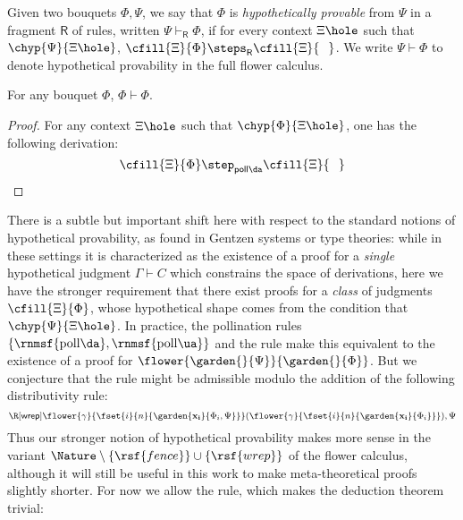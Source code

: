 \begin{definition}
  Given two bouquets $\Phi, \Psi$, we say that $\Phi$ is \emph{hypothetically
  provable} from $\Psi$ in a fragment $\mathsf{R}$ of rules, written $\Psi
  \vdash_{\mathsf{R}} \Phi$, if for every context $\Xi\hole$ such that
  $\chyp{\Psi}{\Xi\hole}$, $\cfill{\Xi}{\Phi} \steps_{\mathsf{R}}
  \cfill{\Xi}{\phantom{\Phi}}$. We write $\Psi \vdash \Phi$ to denote
  hypothetical provability in the full flower calculus.
\end{definition}

\begin{lemma}[Reflexivity]
  For any bouquet $\Phi$, $\Phi \vdash \Phi$.
\end{lemma}
\begin{proof}
  For any context $\Xi\hole$ such that $\chyp{\Phi}{\Xi\hole}$, one has the following
  derivation:
  $$
  \cfill{\Xi}{\Phi} \step_{\mathsf{poll{\da}}}
  \cfill{\Xi}{\phantom{\Phi}}
  $$
\end{proof}

There is a subtle but important shift here with respect to the standard notions
of hypothetical provability, as found in Gentzen systems or type theories: while
in these settings it is characterized as the existence of a proof for a
\emph{single} hypothetical judgment $\Gamma \vdash C$ which constrains the space
of derivations, here we have the stronger requirement that there exist proofs
for a \emph{class} of judgments $\cfill{\Xi}{\Phi}$, whose hypothetical shape
comes from the condition that $\chyp{\Psi}{\Xi\hole}$. In practice, the
pollination rules $\{\text{\rnmsf{poll{\da}}},
\text{\rnmsf{poll{\ua}}}\}$ and the {} rule make this equivalent
to the existence of a proof for $\flower{\garden{{}}{\Psi}}{\garden{{}}{\Phi}}$. But
we conjecture that the {} rule might be admissible modulo the
addition of the following distributivity rule:
$$
\R[\textsf{wrep}]
  {\flower{\gamma}{\fset{i}{n}{\garden{\mathbf{x_i}}{\Phi_i, \Psi}}}}
  {(\flower{\gamma}{\fset{i}{n}{\garden{\mathbf{x_i}}{\Phi_i}}}), \Psi}
$$
Thus our stronger notion of hypothetical provability makes more sense in the
variant $\Nature \setminus \{\rsf{fence}\} \cup \{\rsf{wrep}\}$ of the flower
calculus, although it will still be useful in this work to make meta-theoretical
proofs slightly shorter. For now we allow the {} rule, which makes
the deduction theorem trivial:

